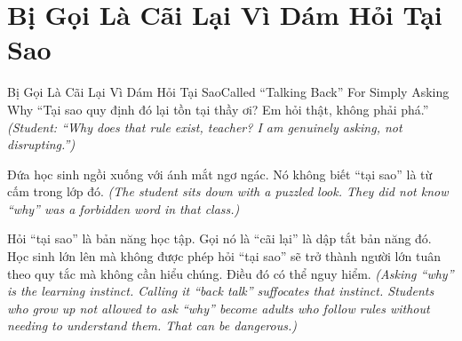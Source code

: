 \section{Bị Gọi Là Cãi Lại Vì Dám Hỏi Tại Sao}
\begin{truyen}{Bị Gọi Là Cãi Lại Vì Dám Hỏi Tại Sao}{Called ``Talking Back'' For Simply Asking Why}
 ``Tại sao quy định đó lại tồn tại thầy ơi? Em hỏi thật, không phải phá.''
\textit{(Student: ``Why does that rule exist, teacher? I am genuinely asking, not disrupting.'')}


Đứa học sinh ngồi xuống với ánh mắt ngơ ngác. Nó không biết ``tại sao'' là từ cấm trong lớp đó.
\textit{(The student sits down with a puzzled look. They did not know ``why'' was a forbidden word in that class.)}

\begin{baihoc}
Hỏi ``tại sao'' là bản năng học tập. Gọi nó là ``cãi lại'' là dập tắt bản năng đó. Học sinh lớn lên mà không được phép hỏi ``tại sao'' sẽ trở thành người lớn tuân theo quy tắc mà không cần hiểu chúng. Điều đó có thể nguy hiểm.
\textit{(Asking ``why'' is the learning instinct. Calling it ``back talk'' suffocates that instinct. Students who grow up not allowed to ask ``why'' become adults who follow rules without needing to understand them. That can be dangerous.)}
\end{baihoc}
\end{truyen}

